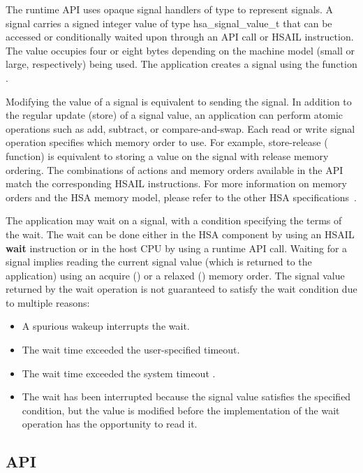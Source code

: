 \documentclass[final,oneside]{book}
\newcommand{\reffun}[1]{\textbf{#1}}
\newcommand{\reftyp}[1]{#1}
\newcommand{\refhsl}[1]{\reffun{#1}}
\begin{document}
The runtime API uses opaque signal handlers of type  to
represent signals. A signal carries a signed integer value of type
\reftyp{hsa_signal_value_t} that can be accessed or conditionally waited upon
through an API call or HSAIL instruction. The value occupies four or eight bytes
depending on the machine model (small or large, respectively) being used. The
application creates a signal using the function .

Modifying the value of a signal is equivalent to sending the signal. In addition
to the regular update (store) of a signal value, an application can perform
atomic operations such as add, subtract, or compare-and-swap. Each read or write
signal operation specifies which memory order to use. For example, store-release
( function) is equivalent to storing a value on
the signal with release memory ordering. The combinations of actions and
memory orders available in the API match the corresponding HSAIL
instructions. For more information on memory orders and the HSA memory model,
please refer to the other HSA specifications~\cite{prm, sar}.

The application may wait on a signal, with a condition specifying the terms of
the wait. The wait can be done either in the HSA component by using an HSAIL
\refhsl{wait} instruction or in the host CPU by using a runtime API
call. Waiting for a signal implies reading the current signal value (which is
returned to the application) using an acquire ()
or a relaxed () memory order. The signal value
returned by the wait operation is not guaranteed to satisfy the wait condition
due to multiple reasons:
\begin{itemize}[itemsep=1pt,topsep=3pt,partopsep=0pt]
\item A spurious wakeup interrupts the wait.
\item The wait time exceeded the user-specified timeout.
\item The wait time exceeded the system timeout
  .
\item The wait has been interrupted because the signal value satisfies the
  specified condition, but the value is modified before the implementation of
  the wait operation has the opportunity to read it.
\end{itemize}


\subsection{API}
\end{document}
